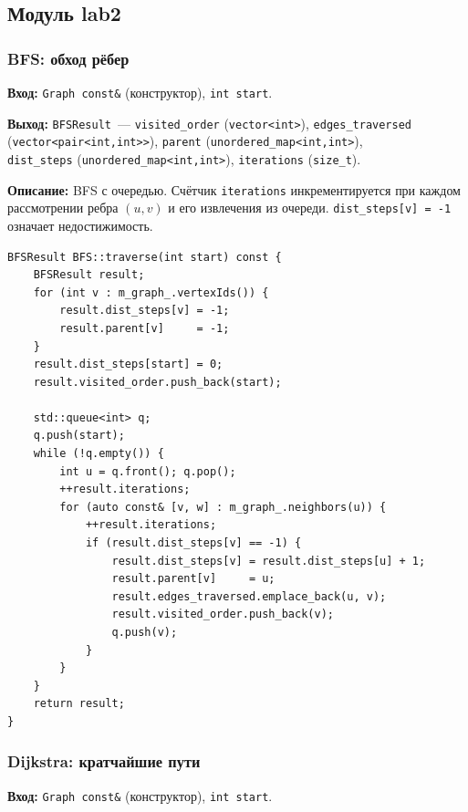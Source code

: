 \subsection{Модуль lab2}

\subsubsection{BFS: обход рёбер}

\textbf{Вход:} \texttt{Graph const\&} (конструктор), \texttt{int start}.

\textbf{Выход:} \texttt{BFSResult}~--- \texttt{visited\_order}
(\texttt{vector<int>}), \texttt{edges\_traversed}
(\texttt{vector<pair<int,int>>}), \texttt{parent}
(\texttt{unordered\_map<int,int>}), \\ \texttt{dist\_steps}
(\texttt{unordered\_map<int,int>}), \texttt{iterations} (\texttt{size\_t}).

\textbf{Описание:} BFS с очередью. Счётчик
\texttt{iterations} инкрементируется при каждом рассмотрении ребра $(u, v)$ и его извлечения из очереди. \texttt{dist\_steps[v] = -1}
означает недостижимость.

\begin{lstlisting}[style=cppstyle, caption={Обход рёбер в ширину (BFS.cc)}]
BFSResult BFS::traverse(int start) const {
    BFSResult result;
    for (int v : m_graph_.vertexIds()) {
        result.dist_steps[v] = -1;
        result.parent[v]     = -1;
    }
    result.dist_steps[start] = 0;
    result.visited_order.push_back(start);

    std::queue<int> q;
    q.push(start);
    while (!q.empty()) {
        int u = q.front(); q.pop();
        ++result.iterations;
        for (auto const& [v, w] : m_graph_.neighbors(u)) {
            ++result.iterations;
            if (result.dist_steps[v] == -1) {
                result.dist_steps[v] = result.dist_steps[u] + 1;
                result.parent[v]     = u;
                result.edges_traversed.emplace_back(u, v);
                result.visited_order.push_back(v);
                q.push(v);
            }
        }
    }
    return result;
}
\end{lstlisting}

\subsubsection{Dijkstra: кратчайшие пути}

\textbf{Вход:} \texttt{Graph const\&} (конструктор), \texttt{int start}.

